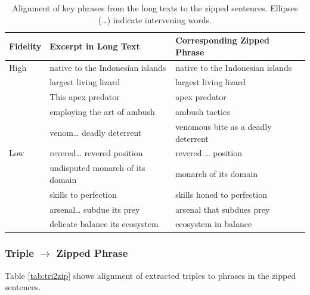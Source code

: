 \documentclass[11pt]{article}
\begin{document}
\begin{table}[htbp]
  \centering
  \caption{Alignment of key phrases from the long texts to the zipped sentences. Ellipses (\ldots) indicate intervening words.}
  \label{tab:long2zip}
  \begin{tabular}{@{}lp{6.2cm}p{6.2cm}@{}}
    \toprule
    \textbf{Fidelity} & \textbf{Excerpt in Long Text} & \textbf{Corresponding Zipped Phrase} \\
    \midrule
    High & native to the Indonesian islands & native to the Indonesian islands \\
         & largest living lizard & largest living lizard \\
         & This apex predator & apex predator \\
         & employing the art of ambush & ambush tactics \\
         & venom\ldots{} deadly deterrent & venomous bite as a deadly deterrent \\
    \addlinespace[3pt]
    Low  & revered\ldots{} revered position & revered \dots{} position \\
         & undisputed monarch of its domain & monarch of its domain \\
         & skills to perfection & skills honed to perfection \\
         & arsenal\ldots{} subdue its prey & arsenal that subdues prey \\
         & delicate balance its ecosystem & ecosystem in balance \\
    \bottomrule
  \end{tabular}
\end{table}


\subsubsection{
Triple $\rightarrow$ Zipped Phrase}

Table \ref{tab:tri2zip} shows alignment of extracted triples to phrases in the zipped sentences.
\end{document}
